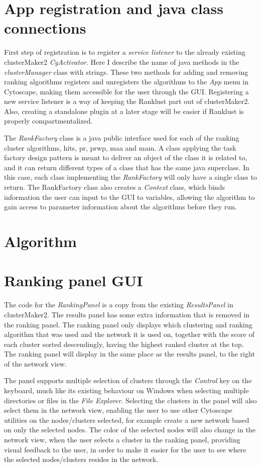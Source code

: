 \section{App registration and java class connections}
First step of registration is to register a \textit{service listener} to the
already existing clusterMaker2 \textit{CyActivator}. Here I describe the name
of java methods in the \textit{clusterManager} class with strings. These two
methods for adding and removing ranking algorithms registers and unregisters the
algorithms to the \textit{App} menu in Cytoscape, making them accessible for the
user through the GUI. Registering a new service listener is a way of keeping the
Ranklust part out of clusterMaker2. Also, creating a standalone plugin at
a later stage will be easier if Ranklust is properly compartmentalized.

The \textit{RankFactory} class is a java public interface used for each of the
ranking cluster algorithms, \gls{hits}, \gls{pr}, \gls{prwp}, \gls{maa} and
\gls{mam}. A class applying the task factory design pattern is meant to deliver
an object of the class it is related to\cite{factory-design}, and it can return
different types of a class that has the same java
superclass\cite{java-superclass}. In this case, each class implementing the
\textit{RankFactory} will only have a single class to return. The RankFactory
class also creates a \textit{Context} class, which binds information the user
can input to the GUI to variables, allowing the algorithm to gain access to
parameter information about the algorithms before they run.

\section{Algorithm}
\section{Ranking panel GUI}
The code for the \textit{RankingPanel} is a copy from the existing
\textit{ResultsPanel} in clusterMaker2. The results panel has some extra
information that is removed in the ranking panel. The ranking panel only
displays which clustering and ranking algorithm that was used and the network it
is used on, together with the score of each cluster sorted descendingly, having
the highest ranked cluster at the top. The ranking panel will display in the
same place as the results panel, to the right of the network view.

The panel supports multiple selection of clusters through the \textit{Control}
key on the keyboard, much like its existing behaviour on Windows when selecting
multiple directories or files in the \textit{File Explorer}. Selecting the
clusters in the panel will also select them in the network view, enabling the
user to use other Cytoscape utilities on the nodes/clusters selected, for
example create a new network based on only the selected nodes. The color of the
selected nodes will also change in the network view, when the user selects a
cluster in the ranking panel, providing visual feedback to the user, in order to
make it easier for the user to see where the selected nodes/clusters resides in
the network.

